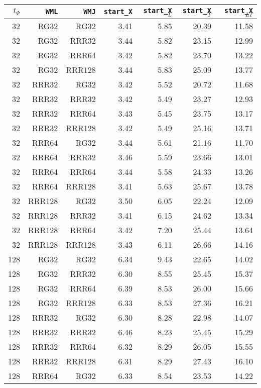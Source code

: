 \begin{table}
\begin{tabular}{|r|r|r|r|r|r|r|}
\hline
$t_{\Psi}$ & \texttt{WML} & \texttt{WMJ} & \texttt{start\_X} & \texttt{start\_X$_{L}$} & \texttt{start\_X$_{T}$} & \texttt{start\_X$_{LT}$} \\
\hline
32 & RG32 & RG32 & 3.41 & 5.85 & 20.39 & 11.58 \\
32 & RG32 & RRR32 & 3.44 & 5.82 & 23.15 & 12.99 \\
32 & RG32 & RRR64 & 3.42 & 5.82 & 23.70 & 13.22 \\
32 & RG32 & RRR128 & 3.44 & 5.83 & 25.09 & 13.77 \\
32 & RRR32 & RG32 & 3.42 & 5.52 & 20.72 & 11.68 \\
32 & RRR32 & RRR32 & 3.42 & 5.49 & 23.27 & 12.93 \\
32 & RRR32 & RRR64 & 3.43 & 5.45 & 23.75 & 13.17 \\
32 & RRR32 & RRR128 & 3.42 & 5.49 & 25.16 & 13.71 \\
32 & RRR64 & RG32 & 3.44 & 5.61 & 21.16 & 11.70 \\
32 & RRR64 & RRR32 & 3.46 & 5.59 & 23.66 & 13.01 \\
32 & RRR64 & RRR64 & 3.44 & 5.58 & 24.33 & 13.26 \\
32 & RRR64 & RRR128 & 3.41 & 5.63 & 25.67 & 13.78 \\
32 & RRR128 & RG32 & 3.50 & 6.05 & 22.24 & 12.09 \\
32 & RRR128 & RRR32 & 3.41 & 6.15 & 24.62 & 13.34 \\
32 & RRR128 & RRR64 & 3.42 & 7.20 & 25.44 & 13.64 \\
32 & RRR128 & RRR128 & 3.43 & 6.11 & 26.66 & 14.16 \\
128 & RG32 & RG32 & 6.34 & 9.43 & 22.65 & 14.02 \\
128 & RG32 & RRR32 & 6.30 & 8.55 & 25.45 & 15.37 \\
128 & RG32 & RRR64 & 6.39 & 8.53 & 26.00 & 15.66 \\
128 & RG32 & RRR128 & 6.33 & 8.53 & 27.36 & 16.21 \\
128 & RRR32 & RG32 & 6.30 & 8.28 & 22.98 & 14.07 \\
128 & RRR32 & RRR32 & 6.46 & 8.23 & 25.45 & 15.29 \\
128 & RRR32 & RRR64 & 6.32 & 8.29 & 26.05 & 15.55 \\
128 & RRR32 & RRR128 & 6.31 & 8.29 & 27.43 & 16.10 \\
128 & RRR64 & RG32 & 6.33 & 8.54 & 23.53 & 14.22 \\

\end{tabular}
\end{table}
